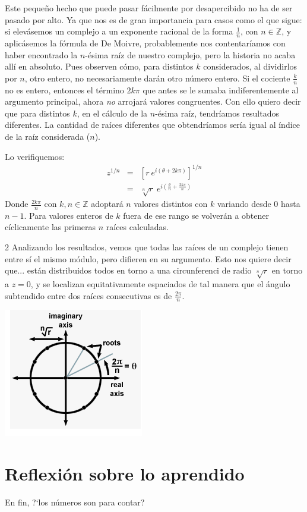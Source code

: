 \documentclass[12pt]{article}
\theoremstyle{definition}
\begin{document}
Este peque\~no hecho que puede pasar f\'acilmente por desapercibido no ha de ser pasado por alto. Ya que nos es de gran importancia para casos como el que sigue: si elev\'asemos un complejo a un exponente racional de la forma $\frac{1}{n}$, con $n \in \mathbb{Z}$, y aplic\'asemos la f\'ormula de De Moivre, probablemente nos contentar\'iamos con haber encontrado la $n$-\'esima ra\'iz de nuestro complejo, pero la historia no acaba all\'i en absoluto. Pues observen c\'omo, para distintos $k$ considerados, al dividirlos por $n$, otro entero, no necesariamente dar\'an otro n\'umero entero. Si el cociente $\frac{k}{n}$ no es entero, entonces el t\'ermino $2k\pi$ que antes se le sumaba indiferentemente al argumento principal, ahora \textit{no} arrojar\'a valores congruentes. Con ello quiero decir que para distintos $k$, en el c\'alculo de la $n$-\'esima ra\'iz, tendr\'iamos resultados diferentes. La cantidad de ra\'ices diferentes que obtendr\'iamos ser\'ia igual al \'indice de la ra\'iz considerada ($n$).

Lo verifiquemos:
{\large
\begin{eqnarray*}
z^{1/n} &=& \left[r\ e^{i(\theta + 2k\pi)}\right]^{1/n}\\
&=& \sqrt[n]{r}\ e^{i (\frac{\theta}{n} + \frac{2k\pi}{n})}
\end{eqnarray*}
}
Donde $\displaystyle \frac{2k\pi}{n}$ con $k, n \in \mathbb{Z}$ adoptar\'a $n$ valores distintos con $k$ variando desde 0 hasta $n-1$. Para valores enteros de $k$ fuera de ese rango se volver\'an a obtener c\'iclicamente las primeras $n$ ra\'ices calculadas.

\begin{multicols} {2}
Analizando los resultados, vemos que todas las ra\'ices de un complejo tienen entre s\'i el mismo m\'odulo, pero difieren en su argumento. Esto nos quiere decir que... est\'an distribuidos todos en torno a una circunferenci de radio $\sqrt[n]{r}$ en torno a $z=0$, y se localizan equitativamente espaciados de tal manera que el \'angulo subtendido entre dos ra\'ices consecutivas es de $\displaystyle \frac{2\pi}{n}$.
\begin{center}
	\includegraphics[scale=1.2]{roots.png}
\end{center}
\end{multicols}

\section{Reflexi\'on sobre lo aprendido}
En fin, ?`los n\'umeros son para contar?
\end{document}
